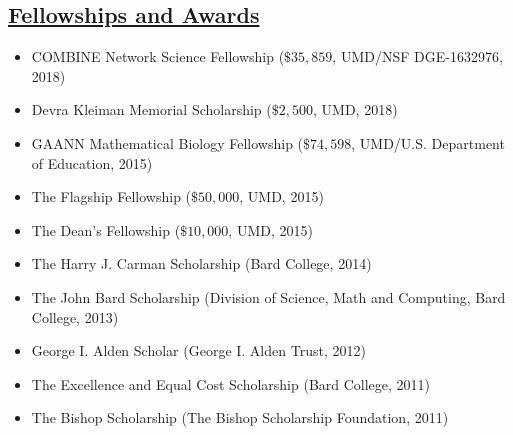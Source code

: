 \documentclass[]{res}
\begin{document}
\begin{resume}
   \section{\underline{Fellowships and Awards}} %
\begin{itemize}[leftmargin=*]
\item[] COMBINE Network Science Fellowship ($\$35,859$, UMD/NSF DGE-1632976, 2018)
\item[] Devra Kleiman Memorial Scholarship ($\$2,500$, UMD, 2018)
\item[] GAANN Mathematical Biology Fellowship ($\$74,598$, UMD/U.S. Department of Education, 2015)
\item[] The Flagship Fellowship ($\$50,000$, UMD, 2015)
\item[] The Dean's Fellowship ($\$10,000$, UMD, 2015)
\item[] The Harry J. Carman Scholarship (Bard College, 2014)
\item[] The John Bard Scholarship (Division of Science, Math and Computing, Bard College, 2013)
\item[] George I. Alden Scholar (George I. Alden Trust, 2012)%
\item[] The Excellence and Equal Cost Scholarship (Bard College, 2011) 
\item[] The Bishop Scholarship (The Bishop Scholarship Foundation, 2011)
\end{itemize}
  

\end{resume}
\end{document}
